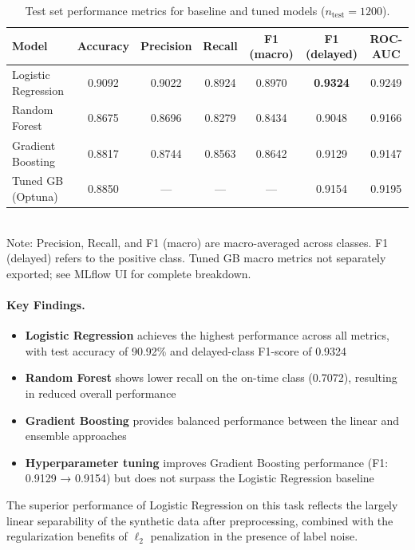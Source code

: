 \documentclass[11pt,a4paper]{article}
\begin{document}
\begin{table}[H]
\centering
\caption{Test set performance metrics for baseline and tuned models ($n_{\text{test}} = 1200$).}
\label{tab:metrics}
\small
\begin{tabular}{lcccccc}
\toprule
\textbf{Model} & \textbf{Accuracy} & \textbf{Precision} & \textbf{Recall} & \textbf{F1 (macro)} & \textbf{F1 (delayed)} & \textbf{ROC-AUC} \\
\midrule
Logistic Regression & 0.9092 & 0.9022 & 0.8924 & 0.8970 & \textbf{0.9324} & 0.9249 \\
Random Forest       & 0.8675 & 0.8696 & 0.8279 & 0.8434 & 0.9048 & 0.9166 \\
Gradient Boosting   & 0.8817 & 0.8744 & 0.8563 & 0.8642 & 0.9129 & 0.9147 \\
Tuned GB (Optuna)   & 0.8850 & --- & --- & --- & 0.9154 & 0.9195 \\
\bottomrule
\end{tabular}\\[4pt]
\scriptsize Note: Precision, Recall, and F1 (macro) are macro-averaged across classes. F1 (delayed) refers to the positive class. Tuned GB macro metrics not separately exported; see MLflow UI for complete breakdown.
\end{table}

\paragraph{Key Findings.}
\begin{itemize}
    \item \textbf{Logistic Regression} achieves the highest performance across all metrics, with test accuracy of 90.92\% and delayed-class F1-score of 0.9324
    \item \textbf{Random Forest} shows lower recall on the on-time class (0.7072), resulting in reduced overall performance
    \item \textbf{Gradient Boosting} provides balanced performance between the linear and ensemble approaches
    \item \textbf{Hyperparameter tuning} improves Gradient Boosting performance (F1: 0.9129 → 0.9154) but does not surpass the Logistic Regression baseline
\end{itemize}

The superior performance of Logistic Regression on this task reflects the largely linear separability of the synthetic data after preprocessing, combined with the regularization benefits of $\ell_2$ penalization in the presence of label noise.
\end{document}
